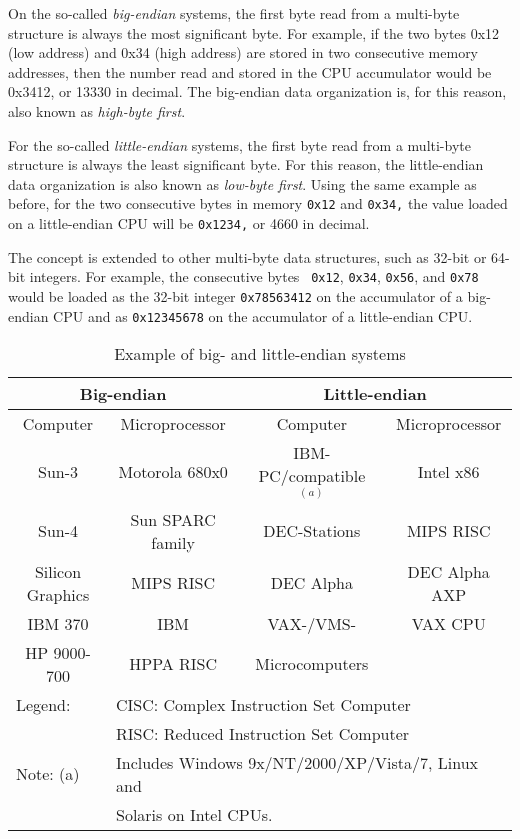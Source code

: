 On the so-called {\em big-endian} systems, the first byte read from a
multi-byte structure is always the most significant byte. For example,
if the two bytes 0x12 (low address) and 0x34 (high address) are stored
in two consecutive memory addresses, then the number read and stored
in the CPU accumulator would be 0x3412, or 13330 in decimal. The
big-endian data organization is, for this reason, also known as {\em
high-byte first}.

For the so-called {\em little-endian} systems, the first byte read
from a multi-byte structure is always the least significant byte. For
this reason, the little-endian data organization is also known as {\em
low-byte first}. Using the same example as before, for the two
consecutive bytes in memory {\tt 0x12} and {\tt 0x34,} the value
loaded on a little-endian CPU will be {\tt 0x1234,} or 4660 in
decimal.

The concept is extended to other multi-byte data structures, such as
32-bit or 64-bit integers. For example, the consecutive bytes {\tt
0x12}, {\tt 0x34}, {\tt 0x56}, and {\tt 0x78} would be loaded as the
32-bit integer {\tt 0x78563412} on the accumulator of a big-endian CPU
and as {\tt 0x12345678} on the accumulator of a little-endian CPU.

\begin{table}
\caption{\SF Example of big- and little-endian systems
         \label{tbl:known-endian}}
\begin{tabular}{|c|c||c|c|}
\hline
\multicolumn{2}{|c||}{Big-endian} & \multicolumn{2}{|c|}{Little-endian} \\
\hline
Computer & Microprocessor
        & Computer & Microprocessor\\
\hline
Sun-3 & Motorola 680x0
        &IBM-PC/compatible$^{(a)}$ & Intel x86\\
Sun-4 & Sun SPARC family
        &DEC-Stations &MIPS RISC\\
Silicon Graphics & MIPS RISC
        &DEC Alpha &DEC Alpha AXP\\
IBM 370 & IBM
        &VAX-/VMS- & VAX CPU\\
HP 9000-700 & HPPA RISC
        & Microcomputers & \\
\hline
\multicolumn{1}{|l}{Legend:}
        &\multicolumn{3}{l|}{CISC: Complex Instruction Set Computer}\\
\multicolumn{1}{|l}{ } 
        &\multicolumn{3}{l|}{RISC: Reduced Instruction Set Computer}\\
\multicolumn{1}{|l}{Note: (a)} &
\multicolumn{3}{l|}{Includes Windows 9x/NT/2000/XP/Vista/7, Linux and}\\
\multicolumn{1}{|l}{ } &
\multicolumn{3}{l|}{Solaris on Intel CPUs.}\\
\hline
\end{tabular}
\end{table}

